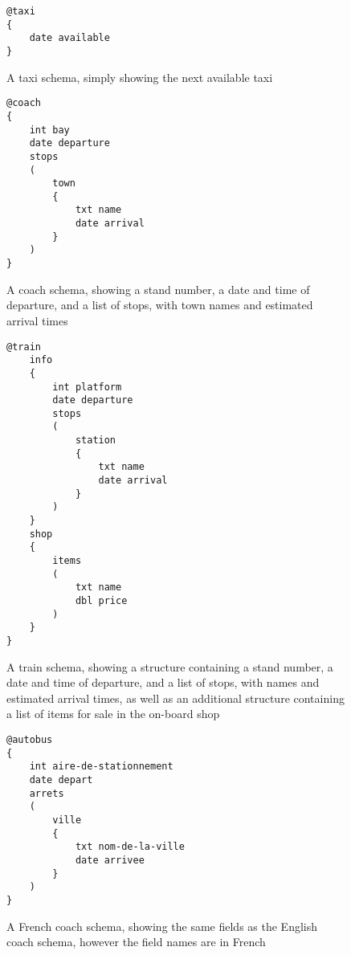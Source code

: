 \begin{figure}[tbh]
\begin{lstlisting}
@taxi
{
	date available
}
\end{lstlisting}
\caption[Example schema for a taxi]{A taxi schema, simply showing the next available taxi}
\label{fig:taxi-schema}
\end{figure}

\begin{figure}[tbh]
\begin{lstlisting}
@coach
{
    int bay
    date departure
    stops
    (
    	town
    	{
    		txt name
    		date arrival
    	}
    )
}
\end{lstlisting}
\caption[Example schema for a coach]{A coach schema, showing a stand number, a date and time of departure, and a list of stops, with town names and estimated arrival times}
\label{fig:coach-schema}
\end{figure}

\begin{figure}[tbh]
\begin{lstlisting}
@train
	info
	{
		int platform
		date departure
		stops
		(
			station
			{
				txt name
				date arrival
			}
		)
	}
	shop
	{
		items
		(
			txt name
			dbl price
		)
	}
}
\end{lstlisting}
\caption[Example schema for a train]{A train schema, showing a structure containing a stand number, a date and time of departure, and a list of stops, with names and estimated arrival times, as well as an additional structure containing a list of items for sale in the on-board shop}
\label{fig:train-schema}
\end{figure}


\begin{figure}[tbh]
\begin{lstlisting}
@autobus
{
    int aire-de-stationnement
    date depart
    arrets
    (
    	ville
    	{
    		txt nom-de-la-ville
    		date arrivee
    	}
    )
}
\end{lstlisting}
\caption[Example schema for a French coach]{A French coach schema, showing the same fields as the English coach schema, however the field names are in French}
\label{fig:french-coach-schema}
\end{figure}
